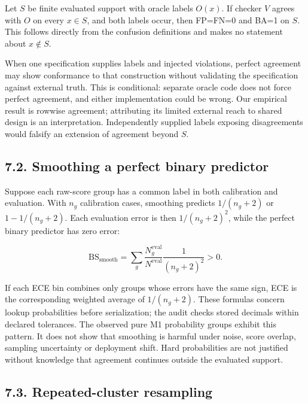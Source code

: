 Let \(S\) be finite evaluated support with oracle labels \(O(x)\). If
checker \(V\) agrees with \(O\) on every \(x\in S\), and both labels
occur, then FP=FN=0 and BA=1 on \(S\). This follows directly from the
confusion definitions and makes no statement about \(x\notin S\).

When one specification supplies labels and injected violations, perfect
agreement may show conformance to that construction without validating
the specification against external truth. This is conditional: separate
oracle code does not force perfect agreement, and either implementation
could be wrong. Our empirical result is rowwise agreement; attributing
its limited external reach to shared design is an interpretation.
Independently supplied labels exposing disagreements would falsify an
extension of agreement beyond \(S\).

\hypertarget{smoothing-a-perfect-binary-predictor}{%
\subsection{7.2. Smoothing a perfect binary
predictor}\label{smoothing-a-perfect-binary-predictor}}

Suppose each raw-score group has a common label in both calibration and
evaluation. With \(n_g\) calibration cases, smoothing predicts
\(1/(n_g+2)\) or \(1-1/(n_g+2)\). Each evaluation error is then
\(1/(n_g+2)^2\), while the perfect binary predictor has zero error:

\[
\mathrm{BS}_{\mathrm{smooth}}=
\sum_g\frac{N_g^{\mathrm{eval}}}{N^{\mathrm{eval}}}\frac{1}{(n_g+2)^2}>0.
\]

If each ECE bin combines only groups whose errors have the same sign,
ECE is the corresponding weighted average of \(1/(n_g+2)\). These
formulas concern lookup probabilities before serialization; the audit
checks stored decimals within declared tolerances. The observed pure M1
probability groups exhibit this pattern. It does not show that smoothing
is harmful under noise, score overlap, sampling uncertainty or
deployment shift. Hard probabilities are not justified without knowledge
that agreement continues outside the evaluated support.

\hypertarget{repeated-cluster-resampling}{%
\subsection{7.3. Repeated-cluster
resampling}\label{repeated-cluster-resampling}}


